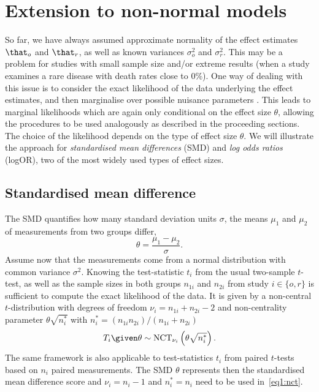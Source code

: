 \section{Extension to non-normal models} \label{sec1:tdist}
So far, we have always assumed approximate normality of the effect estimates
$\that_o$ and $\that_r$, as well as known variances $\sigma^2_o$ and
$\sigma^2_r$. This may be a problem for studies with small sample size and/or
extreme results (\eg when a study examines a rare disease with death rates close
to 0\%). One way of dealing with this issue is to consider the exact likelihood
of the data underlying the effect estimates, and then marginalise over possible
nuisance parameters \citep[Chapter 8.2.2]{Spiegelhalter2004}. This leads to
marginal likelihoods which are again only conditional on the effect size
$\theta$, allowing the procedures to be used analogously as described in the
proceeding sections. The choice of the likelihood depends on the type of effect
size $\theta$. We will illustrate the approach for \emph{standardised mean
differences} (SMD) and \emph{log odds ratios} (logOR), two of the most widely
used types of effect sizes.

\subsection{Standardised mean difference}
The SMD quantifies how many standard deviation units $\sigma$, the means $\mu_1$
and $\mu_2$ of measurements from two groups differ, \ie
$$\theta = \frac{\mu_1 - \mu_2}{\sigma}.$$
Assume now that the measurements come from a normal distribution with common
variance $\sigma^2$. Knowing the test-statistic $t_i$ from the usual two-sample
$t$-test, as well as the sample sizes in both groups $n_{1i}$ and $n_{2i}$ from
study $i \in \{o, r\}$ is sufficient to compute the exact likelihood of the
data. It is given by a non-central $t$-distribution with degrees of freedom
$\nu_i = n_{1i} + n_{2i} - 2$ and non-centrality parameter $\theta \sqrt{n^*_i}$
with $n^*_i = (n_{1i}n_{2i})/(n_{1i} + n_{2i})$ \citep{Bayarri2002}
\begin{align}
  \label{eq1:nct}
  T_i \given \theta \sim \text{NCT}_{\nu_i} \left(\theta \sqrt{n^*_i}\right).
\end{align}
The same framework is also applicable to test-statistics $t_{i}$ from paired
$t$-tests based on $n_{i}$ paired measurements. The SMD $\theta$ represents then
the standardised mean difference score and $\nu_{i} = n_{i} - 1$ and
$n_{i}^{*} = n_{i}$ need to be used in~\eqref{eq1:nct}.


